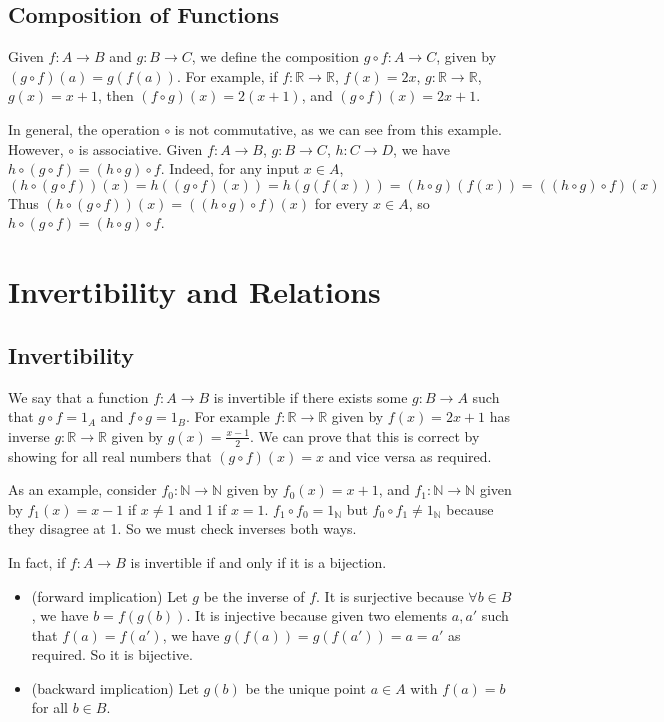 \documentclass{article}
\begin{document}
\subsection{Composition of Functions}
Given $f\colon A \to B$ and $g\colon B \to C$, we define the composition $g\circ f \colon A \to C$, given by $(g\circ f)(a) = g(f(a))$. For example, if $f\colon \mathbb R \to \mathbb R$, $f(x) = 2x$, $g\colon \mathbb R \to \mathbb R$, $g(x) = x+1$, then $(f \circ g)(x) = 2(x+1)$, and $(g \circ f)(x) = 2x + 1$.

In general, the operation $\circ$ is not commutative, as we can see from this example. However, $\circ$ is associative. Given $f\colon A \to B$, $g\colon B \to C$, $h\colon C \to D$, we have $h \circ (g \circ f) = (h \circ g) \circ f$. Indeed, for any input $x \in A$,
\[ (h \circ (g \circ f))(x) = h((g \circ f)(x)) = h(g(f(x))) = (h \circ g)(f(x)) = ((h \circ g)\circ f)(x) \]
Thus $(h \circ (g \circ f))(x) = ((h \circ g)\circ f)(x)$ for every $x \in A$, so $h \circ (g \circ f) = (h \circ g)\circ f$.

\section{Invertibility and Relations}
\subsection{Invertibility}
We say that a function $f\colon A \to B$ is invertible if there exists some $g\colon B \to A$ such that $g \circ f = 1_A$ and $f \circ g = 1_B$. For example $f\colon \mathbb R \to \mathbb R$ given by $f(x)=2x+1$ has inverse $g\colon \mathbb R \to \mathbb R$ given by $g(x)=\frac{x-1}{2}$. We can prove that this is correct by showing for all real numbers that $(g\circ f)(x) = x$ and vice versa as required.

As an example, consider $f_0\colon \mathbb N \to \mathbb N$ given by $f_0(x)=x+1$, and $f_1\colon \mathbb N \to \mathbb N$ given by $f_1(x) = x-1$ if $x\neq 1$ and 1 if $x=1$. $f_1\circ f_0 = 1_{\mathbb N}$ but $f_0\circ f_1 \neq 1_{\mathbb N}$ because they disagree at 1. So we must check inverses both ways.

In fact, if $f\colon A \to B$ is invertible if and only if it is a bijection.
\begin{itemize}
	\item (forward implication) Let $g$ be the inverse of $f$. It is surjective because $\forall b \in B$, we have $b=f(g(b))$. It is injective because given two elements $a,a'$ such that $f(a) = f(a')$, we have $g(f(a)) = g(f(a')) = a = a'$ as required. So it is bijective.
	\item (backward implication) Let $g(b)$ be the unique point $a \in A$ with $f(a) = b$ for all $b \in B$.
\end{itemize}
\end{document}
